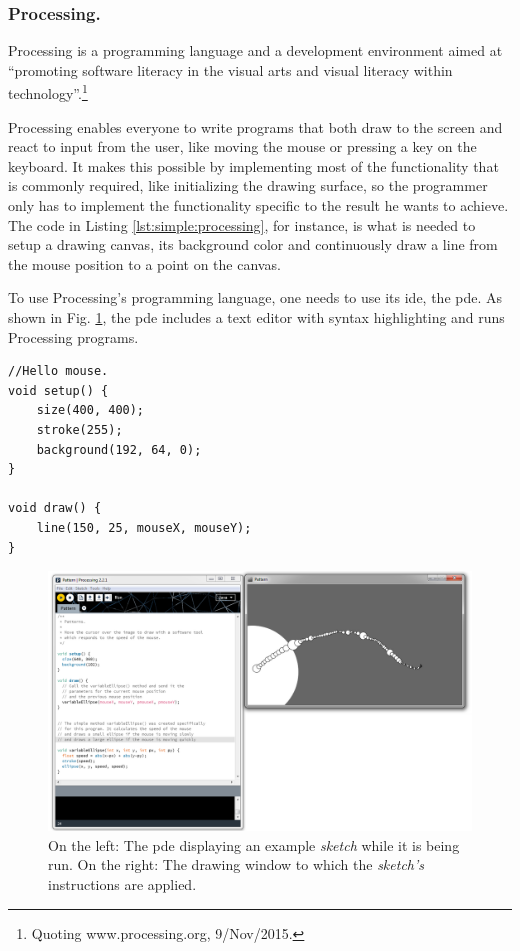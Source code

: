 \documentclass{./llncs2e/llncs}
\begin{document}
	
\subsubsection{Processing.}
	Processing\cite{reas2007processing} is a programming language and a development environment aimed at ``promoting software literacy in the visual arts and visual literacy within technology''.\footnote{Quoting www.processing.org, 9/Nov/2015.}
	
	Processing enables everyone to write programs that both draw to the screen and react to input from the user, like moving the mouse or pressing a key on the keyboard.
	It makes this possible by implementing most of the functionality that is commonly required, like initializing the drawing surface, so the programmer only has to implement the functionality specific to the result he wants to achieve.
	The code in Listing \ref{lst:simple:processing}, for instance, is what is needed to setup a drawing canvas, its background color and continuously draw a line from the mouse position to a point on the canvas.
	
	To use Processing's programming language, one needs to use its \ac{ide}, the \acf{pde}.
	As shown in Fig. \ref{fig:proc:dev:env}, the \ac{pde} includes a text editor with syntax highlighting and runs Processing programs.

	\lstset{ %
		basicstyle=\tt\small,
		numbers=left,
		numberstyle=\tt\small,
		frame=lines,
		tabsize=4
	}
	\begin{lstlisting}[caption={A simple Processing sketch.},label={lst:simple:processing},float]
//Hello mouse.
void setup() {
	size(400, 400);
	stroke(255);
	background(192, 64, 0);
}

void draw() {
	line(150, 25, mouseX, mouseY);
}
	\end{lstlisting}
	
	\begin{figure}
		\centering
		\includegraphics[width=1.0\textwidth]{img/proc_dev_env}
		\caption{On the left: The \ac{pde} displaying an example \emph{sketch} while it is being run. On the right: The drawing window to which the \emph{sketch's} instructions are applied.}
		\label{fig:proc:dev:env}
	\end{figure} 
	
\end{document}
